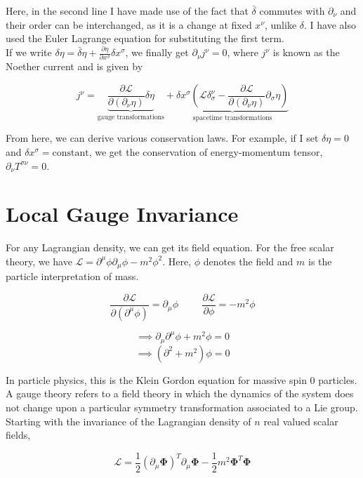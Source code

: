 \noindent Here, in the second line I have made use of the fact that $\bar\delta$ commutes with $\partial_\nu$ and their order can be interchanged, as it is a change at fixed $x^\nu$, unlike $\delta$. I have also used the Euler Lagrange equation for substituting the first term.\\

\noindent If we write $\delta\eta=\bar\delta\eta+\frac{\partial\eta}{\partial x^\sigma}\delta x^\sigma$, we finally get $\partial_\nu j^\nu=0$, where $j^\nu$ is known as the Noether current and is given by

$$j^\nu=\underbrace{\frac{\partial\mathcal{L}}{\partial(\partial_\nu\eta)}\delta\eta}_{\text{gauge transformations}}+\underbrace{\delta x^\sigma \left(\mathcal{L}\delta_\sigma^\nu-\frac{\partial\mathcal{L}}{\partial(\partial_\nu\eta)}\partial_\sigma\eta\right)}_{\text{spacetime transformations}}$$

\noindent From here, we can derive various conservation laws. For example, if I set $\delta\eta=0$ and $\delta x^\sigma=\text{constant}$, we get the conservation of energy-momentum tensor, $\partial_\nu T^{\sigma\nu}=0$.

\section{Local Gauge Invariance}
For any Lagrangian density, we can get its field equation. For the free scalar theory, we have $\mathcal{L}=\partial^\mu\phi\partial_\mu\phi-m^2\phi^2$. Here, $\phi$ denotes the field and $m$ is the particle interpretation of mass.

$$\frac{\partial\mathcal{L}}{\partial(\partial^\mu\phi)}=\partial_\mu\phi \hspace{1cm} \frac{\partial\mathcal{L}}{\partial\phi}=-m^2\phi$$

$$\implies\partial_\mu\partial^\mu \phi+m^2\phi=0$$
$$\implies(\partial^2+m^2)\phi=0$$

\noindent In particle physics, this is the Klein Gordon equation for massive spin 0 particles.\\

\noindent A gauge theory refers to a field theory in which the dynamics of the system does not change upon a particular symmetry transformation associated to a Lie group. Starting with the invariance of the Lagrangian density of $n$ real valued scalar fields,

$$\mathcal{L}=\frac{1}{2}(\partial_\mu\boldsymbol\Phi)^T\partial_\mu\boldsymbol\Phi-\frac{1}{2}m^2\boldsymbol\Phi^T\boldsymbol\Phi$$

